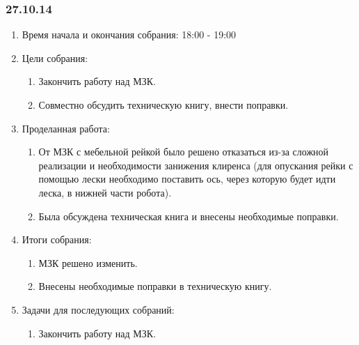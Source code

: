 	
\subsubsection{27.10.14}

\begin{enumerate}
	\item Время начала и окончания собрания:
	18:00 - 19:00
	\item Цели собрания:
	\begin{enumerate}
	  \item Закончить работу над МЗК.
	  
	  \item Совместно обсудить техническую книгу, внести поправки.
	  
    \end{enumerate}
    
	\item Проделанная работа:
	\begin{enumerate}
	  \item От МЗК с мебельной рейкой было решено отказаться из-за сложной реализации и необходимости занижения клиренса (для опускания рейки с помощью лески необходимо поставить ось, через которую будет идти леска, в нижней части робота).
      
      \item Была обсуждена техническая книга и внесены необходимые поправки.
      
    \end{enumerate}
    
	\item Итоги собрания: 
	\begin{enumerate}
	  \item МЗК решено изменить.
	  
	  \item Внесены необходимые поправки в техническую книгу.
      
    \end{enumerate}
    
	\item Задачи для последующих собраний:
	\begin{enumerate}
	  \item Закончить работу над МЗК.
	  
    \end{enumerate}     
\end{enumerate}
\fillpage
